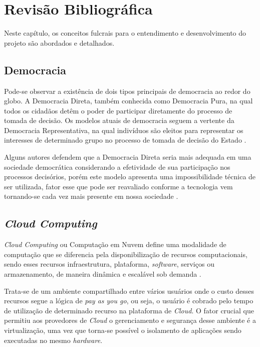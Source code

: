 \chapter{Revisão Bibliográfica}
\label{revisao}
Neste capítulo, os conceitos fulcrais para o entendimento e desenvolvimento do projeto são abordados e detalhados.

\section{Democracia} Pode-se observar a existência de dois tipos principais de democracia ao redor do globo. A Democracia Direta, também conhecida como Democracia Pura, na qual todos os cidadãos detêm o poder de participar diretamente do processo de tomada de decisão. Os modelos atuais de democracia seguem a vertente da Democracia Representativa, na qual indivíduos são eleitos para representar os interesses de determinado grupo no processo de tomada de decisão do Estado \cite{impactofictonreiforcingcitizens}. 

Alguns autores defendem que a Democracia Direta seria mais adequada em uma sociedade democrática considerando a efetividade de sua participação nos processos decisórios, porém este modelo apresenta uma impossibilidade técnica de ser utilizada, fator esse que pode ser reavaliado conforme a tecnologia vem tornando-se cada vez mais presente em nossa sociedade \cite{impactofictonreiforcingcitizens}.

\section{\textit{Cloud Computing}} \textit{Cloud Computing} ou Computação em Nuvem define uma modalidade de computação que se diferencia pela disponibilização de recursos computacionais, sendo esses recursos infraestrutura, plataforma, \textit{software}, serviços ou armazenamento, de maneira dinâmica e escalável sob demanda \cite{cloudcomputing}. 

Trata-se de um ambiente compartilhado entre vários usuários onde o custo desses recursos segue a lógica de \textit{pay as you go}, ou seja, o usuário é cobrado pelo tempo de utilização de determinado recurso na plataforma de \textit{Cloud}. O fator crucial que permitiu aos provedores de \textit{Cloud} o gerenciamento e segurança desse ambiente é a virtualização, uma vez que torna-se possível o isolamento de aplicações sendo executadas no mesmo \textit{hardware}\cite{cloudcomputing}.

